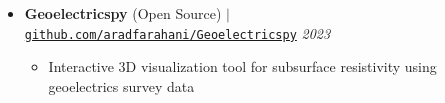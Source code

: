 \documentclass[letterpaper,11pt]{article}
\begin{document}
						\vspace{-1.2em}
	\begin{itemize}[left=0pt, label={}, topsep=7.5pt, partopsep=0pt, itemsep=6pt, parsep=0pt]
		\item \textbf{Geoelectricspy} (Open Source) $|$ \normalfont\href{https://github.com/aradfarahani/Geoelectricspy/}{\texttt{github.com/aradfarahani/Geoelectricspy}} \hfill \textit{2023}
		\begin{itemize}[left=15pt, label=\textbullet, topsep=4pt, partopsep=0pt, itemsep=3pt, parsep=0pt]
			\item Interactive 3D visualization tool for subsurface resistivity using geoelectrics survey data
		\end{itemize}
	\end{itemize}
						\vspace{-2.7em}
\end{document}
